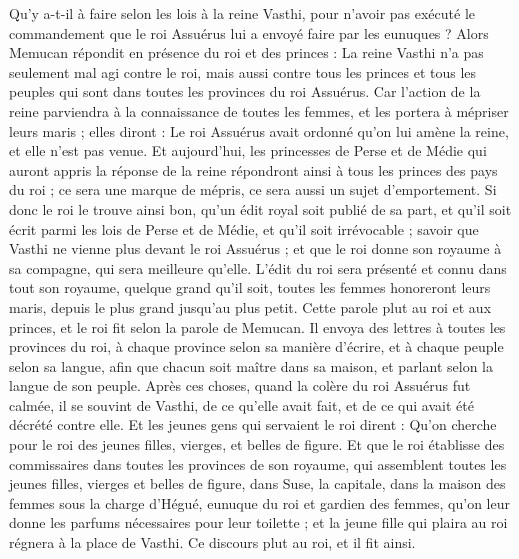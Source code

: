 \begin{multicols}{2}
Qu’y a-t-il à faire selon les lois à la reine Vasthi, pour n’avoir pas exécuté le commandement que le roi Assuérus lui a envoyé faire par les eunuques ?
Alors Memucan répondit en présence du roi et des princes : La reine Vasthi n'a pas seulement mal agi contre le roi, mais aussi contre tous les princes et tous les peuples qui sont dans toutes les provinces du roi Assuérus.
Car l'action de la reine parviendra à la connaissance de toutes les femmes, et les portera à mépriser leurs maris ; elles diront : Le roi Assuérus avait ordonné qu'on lui amène la reine, et elle n'est pas venue.
Et aujourd’hui, les princesses de Perse et de Médie qui auront appris la réponse de la reine répondront ainsi à tous les princes des pays du roi ; ce sera une marque de mépris, ce sera aussi un sujet d’emportement.
Si donc le roi le trouve ainsi bon, qu'un édit royal soit publié de sa part, et qu'il soit écrit parmi les lois de Perse et de Médie, et qu’il soit irrévocable ; savoir que Vasthi ne vienne plus devant le roi Assuérus ; et que le roi donne son royaume à sa compagne, qui sera meilleure qu’elle.
L’édit du roi sera présenté et connu dans tout son royaume, quelque grand qu'il soit, toutes les femmes honoreront leurs maris, depuis le plus grand jusqu'au plus petit.
Cette parole plut au roi et aux princes, et le roi fit selon la parole de Memucan.
Il envoya des lettres à toutes les provinces du roi, à chaque province selon sa manière d’écrire, et à chaque peuple selon sa langue, afin que chacun soit maître dans sa maison, et parlant selon la langue de son peuple.
\VerseOne{}Après ces choses, quand la colère du roi Assuérus fut calmée, il se souvint de Vasthi, de ce qu'elle avait fait, et de ce qui avait été décrété contre elle.
Et les jeunes gens qui servaient le roi dirent : Qu'on cherche pour le roi des jeunes filles, vierges, et belles de figure.
Et que le roi établisse des commissaires dans toutes les provinces de son royaume, qui assemblent toutes les jeunes filles, vierges et belles de figure, dans Suse, la capitale, dans la maison des femmes sous la charge d'Hégué, eunuque du roi et gardien des femmes, qu'on leur donne les parfums nécessaires pour leur toilette ;
et la jeune fille qui plaira au roi régnera à la place de Vasthi. Ce discours plut au roi, et il fit ainsi.

\end{multicols}
